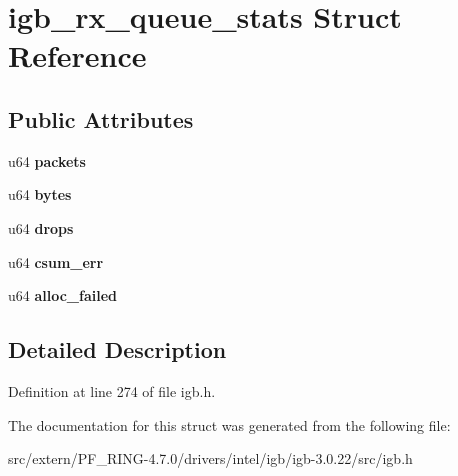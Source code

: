 \hypertarget{structigb__rx__queue__stats}{
\section{igb\_\-rx\_\-queue\_\-stats Struct Reference}
\label{structigb__rx__queue__stats}
}
\subsection*{Public Attributes}
\begin{DoxyCompactItemize}
\item 
\hypertarget{structigb__rx__queue__stats_a0c2c949f27f2c8b1e4b1cea1f0d7dcd6}{
u64 {\bfseries packets}}
\label{structigb__rx__queue__stats_a0c2c949f27f2c8b1e4b1cea1f0d7dcd6}

\item 
\hypertarget{structigb__rx__queue__stats_a355fdc03282ab70ecf81d37e82372016}{
u64 {\bfseries bytes}}
\label{structigb__rx__queue__stats_a355fdc03282ab70ecf81d37e82372016}

\item 
\hypertarget{structigb__rx__queue__stats_a477dd9423db180957fbaf3152e2daf61}{
u64 {\bfseries drops}}
\label{structigb__rx__queue__stats_a477dd9423db180957fbaf3152e2daf61}

\item 
\hypertarget{structigb__rx__queue__stats_a6c5c4ebcb260b1efa1e9cce9e7c02baf}{
u64 {\bfseries csum\_\-err}}
\label{structigb__rx__queue__stats_a6c5c4ebcb260b1efa1e9cce9e7c02baf}

\item 
\hypertarget{structigb__rx__queue__stats_af4088e4b71558bbefe999709d0402d99}{
u64 {\bfseries alloc\_\-failed}}
\label{structigb__rx__queue__stats_af4088e4b71558bbefe999709d0402d99}

\end{DoxyCompactItemize}


\subsection{Detailed Description}


Definition at line 274 of file igb.h.



The documentation for this struct was generated from the following file:\begin{DoxyCompactItemize}
\item 
src/extern/PF\_\-RING-\/4.7.0/drivers/intel/igb/igb-\/3.0.22/src/igb.h\end{DoxyCompactItemize}
